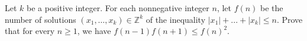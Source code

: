 \documentclass{article}
\begin{document}
\setlength{\parindent}{0pt}
Let $k$ be a positive integer. For each nonnegative integer $n$, let $f(n)$ be the number of solutions $(x_1,\ldots,x_k)\in\mathbb{Z}^k$ of the inequality $|x_1|+...+|x_k|\leq n$. Prove that for every $n\ge1$, we have $f(n-1)f(n+1)\leq f(n)^2$.
\end{document}
